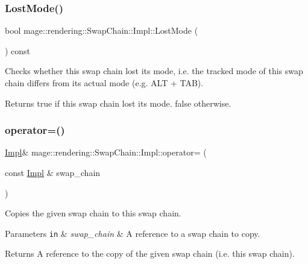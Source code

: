 \subsubsection{\texorpdfstring{Lost\+Mode()}{LostMode()}}
{\footnotesize\ttfamily bool mage\+::rendering\+::\+Swap\+Chain\+::\+Impl\+::\+Lost\+Mode (\begin{DoxyParamCaption}{ }\end{DoxyParamCaption}) const\hspace{0.3cm}{\ttfamily [noexcept]}}

Checks whether this swap chain lost its mode, i.\+e. the tracked mode of this swap chain differs from its actual mode (e.\+g. A\+LT + T\+AB).

\begin{DoxyReturn}{Returns}
{\ttfamily true} if this swap chain lost its mode. {\ttfamily false} otherwise. 
\end{DoxyReturn}
\hypertarget{classmage_1_1rendering_1_1_swap_chain_1_1_impl_aabec221c1f9b95b5b8001823914e65b8}{}\label{classmage_1_1rendering_1_1_swap_chain_1_1_impl_aabec221c1f9b95b5b8001823914e65b8} 
\subsubsection{\texorpdfstring{operator=()}{operator=()}\hspace{0.1cm}{\footnotesize\ttfamily [1/2]}}
{\footnotesize\ttfamily \hyperlink{classmage_1_1rendering_1_1_swap_chain_1_1_impl}{Impl}\& mage\+::rendering\+::\+Swap\+Chain\+::\+Impl\+::operator= (\begin{DoxyParamCaption}\item[{const \hyperlink{classmage_1_1rendering_1_1_swap_chain_1_1_impl}{Impl} \&}]{swap\+\_\+chain }\end{DoxyParamCaption})\hspace{0.3cm}{\ttfamily [delete]}}

Copies the given swap chain to this swap chain.


\begin{DoxyParams}[1]{Parameters}
\mbox{\tt in}  & {\em swap\+\_\+chain} & A reference to a swap chain to copy. \\
\hline
\end{DoxyParams}
\begin{DoxyReturn}{Returns}
A reference to the copy of the given swap chain (i.\+e. this swap chain). 
\end{DoxyReturn}
\hypertarget{classmage_1_1rendering_1_1_swap_chain_1_1_impl_a4a1fe13cc2fa4e40a2616aa1d8698912}{}\label{classmage_1_1rendering_1_1_swap_chain_1_1_impl_a4a1fe13cc2fa4e40a2616aa1d8698912} 
